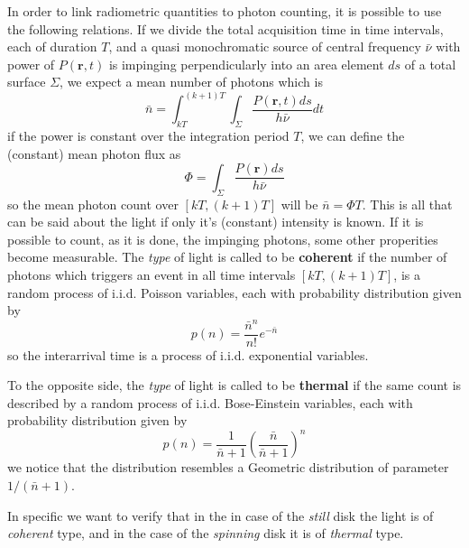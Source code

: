 \documentclass[10pt, a4paper, final]{article}
\begin{document}
\begin{multicols}{2}
In order to link radiometric quantities to photon counting, it is possible to use the following relations. If we divide the total acquisition time in time intervals, each of duration $T$, and a quasi monochromatic source of central frequency $\bar{\nu}$ with power of $P(\mathbf{r}, t)$ is impinging perpendicularly into an area element $ds$ of a total surface $\Sigma$, we expect a mean number of photons which is
\begin{equation*}
    \bar{n} = \int_{kT}^{(k+1)T} \int_\Sigma \frac{P(\mathbf{r}, t) ds}{h \bar{\nu} } dt
\end{equation*}
if the power is constant over the integration period $T$, we can define the (constant) mean photon flux as
\begin{equation*}
    \Phi = \int_\Sigma \frac{P(\mathbf{r}) ds}{h \bar{\nu} } 
\end{equation*}
so the mean photon count over $[kT, (k+1)T]$ will be $\bar{n} = \Phi T$.
This is all that can be said about the light if only it's (constant) intensity is known. If it is possible to count, as it is done, the impinging photons, some other properities become measurable.
The \emph{type} of light is called to be \textbf{coherent} if the number of photons which triggers an event in all time intervals $[kT, (k+1)T]$, is a random process of i.i.d. Poisson variables, each with probability distribution given by
\begin{equation*}
    p(n) = \frac{\bar{n}^n}{n!} e^{-\bar{n}}
\end{equation*}
so the interarrival time is a process of i.i.d. exponential variables.

To the opposite side, the \emph{type} of light is called to be \textbf{thermal} if the same count is described by a random process of i.i.d. Bose-Einstein variables, each with probability distribution given by
\begin{equation*}
    p(n) = \frac{1}{\bar{n} + 1} \left(\frac{\bar{n}}{\bar{n} + 1}\right)^n
\end{equation*}
we notice that the distribution resembles a Geometric distribution of parameter $1/(\bar{n}+1)$.

In specific we want to verify that in the in case of the \emph{still} disk the light is of \emph{coherent} type, and in the case of the \emph{spinning} disk it is of \emph{thermal} type.
\vspace{15pt}


\end{multicols}
\end{document}
